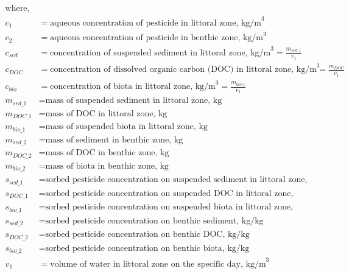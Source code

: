 \documentclass[fleqn, oneside, 11pt]{article}%
\begin{document}
\begin{preview}
\begin{align*}%
\text{where,} \nonumber \\
c_{1} & = \text{aqueous concentration of pesticide in littoral zone, kg/m}^{\text{3}} \nonumber \\
c_{2} & = \text{aqueous concentration of pesticide in benthic zone, kg/m}^{\text{3}} \nonumber \\
c_{sed} & = \text{concentration of suspended sediment in littoral zone, kg/m}^{\text{3}} = \frac{m_{sed\_1}}{v_{1}} \nonumber \\
c_{DOC} & = \text{concentration of dissolved organic carbon (DOC) in littoral zone, kg/m}^{\text{3}} = \frac{m_{DOC}}{v_{1}} \nonumber \\
c_{bio} & = \text{concentration of biota in littoral zone, kg/m}^{\text{3}} = \frac{m_{bio\_1}}{v_{1}} \nonumber \\
m_{sed\_1} & = \text{mass of suspended sediment in littoral zone, kg} \nonumber \\
m_{DOC\_1} & = \text{mass of DOC in littoral zone, kg} \nonumber \\
m_{bio\_1} & = \text{mass of suspended biota in littoral zone, kg} \nonumber \\
m_{sed\_2} & = \text{mass of sediment in benthic zone, kg} \nonumber \\
m_{DOC\_2} & = \text{mass of DOC in benthic zone, kg} \nonumber \\
m_{bio\_2} & = \text{mass of biota in benthic zone, kg} \nonumber \\
s_{sed\_1} & = \text{sorbed pesticide concentration on suspended sediment in littoral zone, kg/kg} \nonumber \\
s_{DOC\_1} & = \text{sorbed pesticide concentration on suspended DOC in littoral zone, kg/kg} \nonumber \\
s_{bio\_1} & = \text{sorbed pesticide concentration on suspended biota in littoral zone, kg/kg} \nonumber \\
s_{sed\_2} & = \text{sorbed pesticide concentration on benthic sediment, kg/kg} \nonumber \\
s_{DOC\_2} & = \text{sorbed pesticide concentration on benthic DOC, kg/kg} \nonumber \\
s_{bio\_2} & = \text{sorbed pesticide concentration on benthic biota, kg/kg} \nonumber \\
v_{1} & = \text{volume of water in littoral zone on the specific day, kg/m}^{\text{3}} \nonumber \\

\end{align*}
\end{preview}
\end{document}

